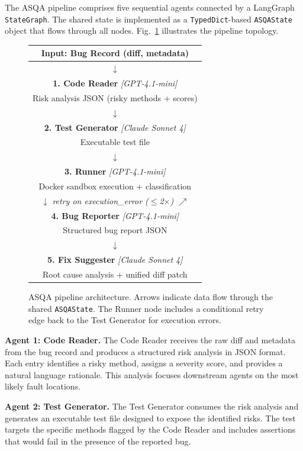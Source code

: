 \documentclass[conference]{IEEEtran}
\begin{document}
The ASQA pipeline comprises five sequential agents connected by a LangGraph \texttt{StateGraph}. The shared state is implemented as a \texttt{TypedDict}-based \texttt{ASQAState} object that flows through all nodes. Fig.~\ref{fig:pipeline} illustrates the pipeline topology.

\begin{figure}[htbp]
\centering
\small
\begin{tabular}{|c|}
\hline
\textbf{Input: Bug Record (diff, metadata)} \\
\hline
$\downarrow$ \\
\hline
\textbf{1. Code Reader} \textit{[GPT-4.1-mini]} \\
Risk analysis JSON (risky methods + scores) \\
\hline
$\downarrow$ \\
\hline
\textbf{2. Test Generator} \textit{[Claude Sonnet 4]} \\
Executable test file \\
\hline
$\downarrow$ \\
\hline
\textbf{3. Runner} \textit{[GPT-4.1-mini]} \\
Docker sandbox execution + classification \\
\hline
$\downarrow$ \quad \textit{retry on execution\_error ($\leq$2$\times$)} $\nearrow$ \\
\hline
\textbf{4. Bug Reporter} \textit{[GPT-4.1-mini]} \\
Structured bug report JSON \\
\hline
$\downarrow$ \\
\hline
\textbf{5. Fix Suggester} \textit{[Claude Sonnet 4]} \\
Root cause analysis + unified diff patch \\
\hline
\end{tabular}
\caption{ASQA pipeline architecture. Arrows indicate data flow through the shared \texttt{ASQAState}. The Runner node includes a conditional retry edge back to the Test Generator for execution errors.}
\label{fig:pipeline}
\end{figure}

\textbf{Agent 1: Code Reader.} The Code Reader receives the raw diff and metadata from the bug record and produces a structured risk analysis in JSON format. Each entry identifies a risky method, assigns a severity score, and provides a natural language rationale. This analysis focuses downstream agents on the most likely fault locations.

\textbf{Agent 2: Test Generator.} The Test Generator consumes the risk analysis and generates an executable test file designed to expose the identified risks. The test targets the specific methods flagged by the Code Reader and includes assertions that would fail in the presence of the reported bug.
\end{document}
